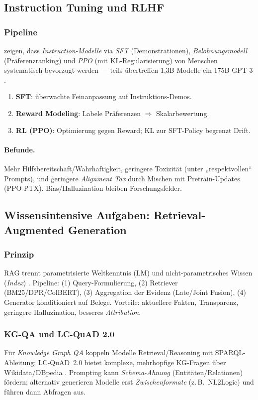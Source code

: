 \subsection{Instruction Tuning und RLHF}
\subsubsection{Pipeline}
\citeauthor{ouyang2022training} zeigen, dass \emph{Instruction-Modelle} via \emph{SFT} (Demonstrationen), \emph{Belohnungsmodell} (Präferenzranking) und \emph{PPO} (mit KL-Regularisierung) von Menschen systematisch bevorzugt werden — teils übertreffen 1{,}3B-Modelle ein 175B GPT-3 \cite{ouyang2022training}. 

\begin{enumerate}
  \item \textbf{SFT}: überwachte Feinanpassung auf Instruktions-Demos.
  \item \textbf{Reward Modeling}: Labele Präferenzen $\Rightarrow$ Skalarbewertung.
  \item \textbf{RL (PPO)}: Optimierung gegen Reward; KL zur SFT-Policy begrenzt Drift.
\end{enumerate}

\paragraph{Befunde.} Mehr Hilfsbereitschaft/Wahrhaftigkeit, geringere Toxizität (unter „respektvollen“ Prompts), und geringere \emph{Alignment Tax} durch Mischen mit Pretrain-Updates (PPO-PTX). Bias/Halluzination bleiben Forschungsfelder.

\subsection{Wissensintensive Aufgaben: Retrieval-Augmented Generation}
\subsubsection{Prinzip}
RAG trennt parametrisierte Weltkenntnis (LM) und nicht-parametrisches Wissen (\emph{Index}) \cite{lewis2020rag}. Pipeline: (1) Query-Formulierung, (2) Retriever (BM25/DPR/ColBERT), (3) Aggregation der Evidenz (Late/Joint Fusion), (4) Generator konditioniert auf Belege. 
Vorteile: aktuellere Fakten, Transparenz, geringere Halluzination, besseres \emph{Attribution}. 

\subsubsection{KG-QA und LC-QuAD 2.0}
Für \emph{Knowledge Graph QA} koppeln Modelle Retrieval/Reasoning mit SPARQL-Ableitung; LC-QuAD~2.0 bietet komplexe, mehrhopfige KG-Fragen über Wikidata/DBpedia \cite{dubey2019lcquad2}. Prompting kann \emph{Schema-Ahnung} (Entitäten/Relationen) fördern; alternativ generieren Modelle erst \emph{Zwischenformate} (z.\,B.\ NL2Logic) und führen dann Abfragen aus.

